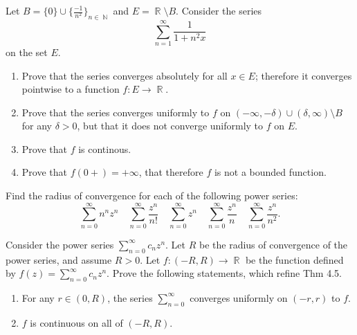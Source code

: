 \documentclass[12pt,letterpaper,boxed]{hmcpset}
\DeclareMathOperator{\N}{\mathbb{N}}
\DeclareMathOperator{\R}{\mathbb{R}}
\begin{document}

\begin{problem}[Exercise 4.3]
Let $B = \{0\}\cup \{\frac{-1}{n^{2}}\}_{n\in\N}$ and $E=\R\setminus B.$ Consider the series $$\sum_{n=1}^{\infty} \frac{1}{1 + n^{2}x}$$ on the set $E$.
\begin{enumerate}
    \item Prove that the series converges absolutely for all $x \in E$; therefore it converges pointwise to a function $f : E\rightarrow \R$.
    \item Prove that the series converges uniformly to $f$ on $(-\infty, -\delta) \cup (\delta, \infty)\setminus B$ for any $\delta > 0$, but that it does not converge uniformly to $f$ on $E$.
    \item Prove that $f$ is continous. 
    \item Prove that $f(0+) = +\infty$, that therefore $f$ is not a bounded function.
\end{enumerate}
\end{problem}

\begin{solution}
\begin{enumerate}
    
\end{enumerate}
\end{solution}

\begin{problem}[Exercise 4.6]
Find the radius of convergence for each of the following power series: $$
\sum_{n=0}^{\infty} n^{n} z^{n} \quad \sum_{n=0}^{\infty} \frac{z^{n}}{n !} \quad \sum_{n=0}^{\infty} z^{n} \quad \sum_{n=0}^{\infty} \frac{z^{n}}{n} \quad \sum_{n=0}^{\infty} \frac{z^{n}}{n^{2}}
.$$
\end{problem}

\begin{solution}

\end{solution}


\begin{problem}[Exercise 4.7]
Consider the power series $\sum_{n=0}^{\infty} c_nz^{n}$. Let $R$ be the radius of convergence of the power series, and assume $R>0$. Let $f: (-R,R) \rightarrow \R$ be the function defined by $f(z)=\sum_{n=0}^{\infty} c_nz^{n}$. Prove the following statements, which refine Thm 4.5.
\begin{enumerate}
    \item For any $r \in (0, R)$, the series $\sum_{n=0}^{\infty}$ converges uniformly on $(-r, r)$ to $f$.
    \item $f$ is continuous on all of $(-R,R)$.
\end{enumerate}
\end{problem}
\end{document}
